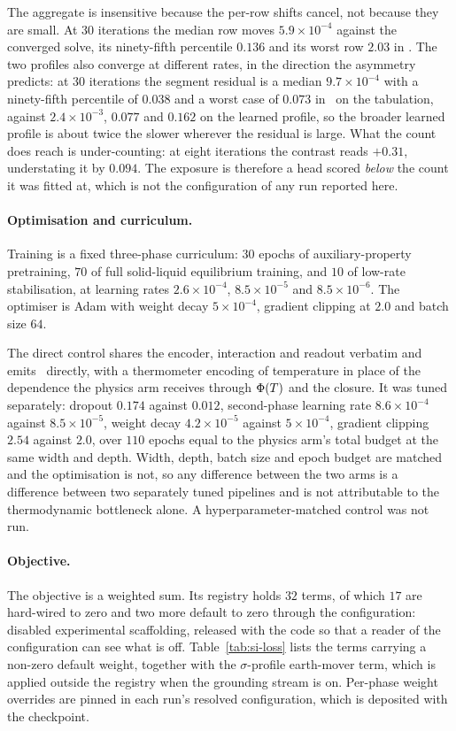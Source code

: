 The aggregate is insensitive because the per-row shifts cancel, not because they are small. At $30$
iterations the median row moves $5.9\times10^{-4}$ against the converged solve, its ninety-fifth
percentile $0.136$ and its worst row $2.03$ in \lnx. The two profiles also converge at different
rates, in the direction the asymmetry predicts: at $30$ iterations the segment residual is a median
$9.7\times10^{-4}$ with a ninety-fifth percentile of $0.038$ and a worst case of $0.073$ in \lngi\
on the tabulation, against $2.4\times10^{-3}$, $0.077$ and $0.162$ on the learned profile, so the
broader learned profile is about twice the slower wherever the residual is large. What the count
does reach is under-counting: at eight iterations the contrast reads $+0.31$, understating it by
$0.094$. The exposure is therefore a head scored \emph{below} the count it was fitted at, which is
not the configuration of any run reported here.

\paragraph{Optimisation and curriculum.}
Training is a fixed three-phase curriculum: $30$ epochs of auxiliary-property pretraining, $70$ of
full solid-liquid equilibrium training, and $10$ of low-rate stabilisation, at learning rates
$2.6\times10^{-4}$, $8.5\times10^{-5}$ and $8.5\times10^{-6}$. The optimiser is Adam with weight
decay $5\times10^{-4}$, gradient clipping at $2.0$ and batch size $64$.

The direct control shares the encoder, interaction and readout verbatim and emits \lnx\ directly,
with a thermometer encoding of temperature in place of the dependence the physics arm receives
through $\Phi(T)$ and the closure. It was tuned separately: dropout $0.174$ against $0.012$,
second-phase learning rate $8.6\times10^{-4}$ against $8.5\times10^{-5}$, weight decay
$4.2\times10^{-5}$ against $5\times10^{-4}$, gradient clipping $2.54$ against $2.0$, over $110$
epochs equal to the physics arm's total budget at the same width and depth. Width, depth, batch
size and epoch budget are matched and the optimisation is not, so any difference between the two
arms is a difference between two separately tuned pipelines and is not attributable to the
thermodynamic bottleneck alone. A hyperparameter-matched control was not run.

\paragraph{Objective.}
The objective is a weighted sum. Its registry holds $32$ terms, of which $17$ are hard-wired to
zero and two more default to zero through the configuration: disabled experimental scaffolding,
released with the code so that a reader of the configuration can see what is off.
Table~\ref{tab:si-loss} lists the terms carrying a non-zero default weight, together with the
$\sigma$-profile earth-mover term, which is applied outside the registry when the grounding stream
is on. Per-phase weight overrides are pinned in each run's resolved configuration, which is
deposited with the checkpoint.

